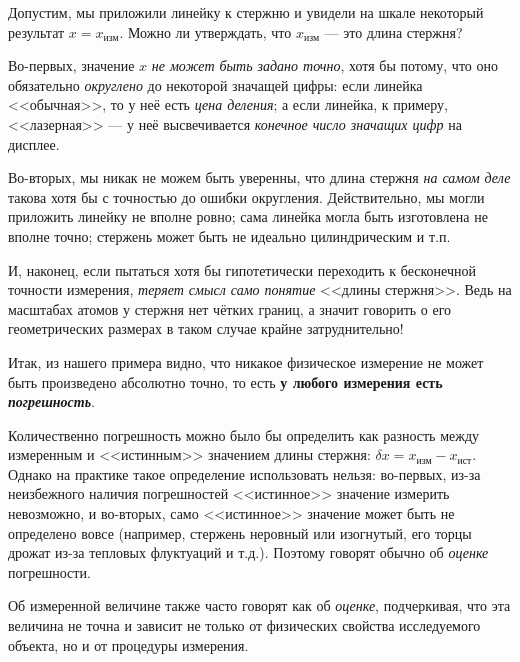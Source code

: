 Допустим, мы приложили линейку к стержню и увидели на шкале некоторый результат
$x=x_{\text{изм}}$. Можно ли утверждать, что $x_{\text{изм}}$ --- это длина
стержня?

Во-первых, значение $x$ \emph{не может быть задано точно}, хотя бы
потому, что оно обязательно \emph{округлено} до некоторой значащей
цифры: если линейка <<обычная>>, то у неё
есть \emph{цена деления}; а если линейка, к примеру, <<лазерная>>
--- у неё высвечивается \emph{конечное число значащих цифр}
на дисплее.

Во-вторых, мы никак не можем быть уверенны, что длина стержня \emph{на
самом деле} такова хотя бы с точностью до ошибки округления. Действительно,
мы могли приложить линейку не вполне ровно; сама линейка могла быть
изготовлена не вполне точно; стержень может быть не идеально цилиндрическим
и т.п.

И, наконец, если пытаться хотя бы гипотетически переходить к бесконечной
точности измерения, \emph{теряет смысл само понятие} <<длины стержня>>. Ведь
на масштабах атомов у стержня нет чётких границ, а значит говорить о его
геометрических размерах в таком случае крайне затруднительно!

Итак, из нашего примера видно, что никакое физическое измерение не может быть
произведено абсолютно точно, то есть
\textbf{у любого измерения есть \emph{погрешность}}.%

Количественно погрешность можно было бы определить как разность между
измеренным и <<истинным>> значением длины стержня:
$\delta x=x_{\text{изм}}-x_{\text{ист}}$. Однако на практике такое определение
использовать нельзя: во-первых, из-за неизбежного наличия
погрешностей <<истинное>> значение измерить невозможно, и во-вторых, само
<<истинное>> значение может быть не определено вовсе (например, стержень
неровный или изогнутый, его торцы дрожат из-за тепловых флуктуаций и т.д.).
Поэтому говорят обычно об \emph{оценке} погрешности.

Об измеренной величине также часто говорят как об \emph{оценке}, подчеркивая,
что эта величина не точна и зависит не только от физических свойства
исследуемого объекта, но и от процедуры измерения.

